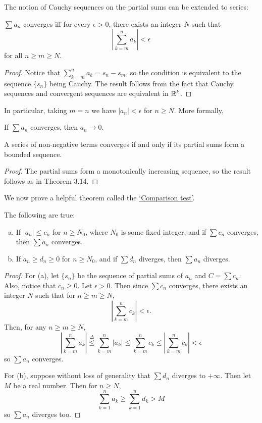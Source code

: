 The notion of Cauchy sequences on the partial sums can be extended to series:
\begin{theorem} %
$\sum a_n$ converges iff for every $\epsilon > 0$, there exists an integer $N$ such that
\[
	\left| \sum_{k=m}^{n} a_k \right| < \epsilon
\]
for all $n \ge m \ge N$. 

\begin{proof}
Notice that $\sum_{k=m}^{n} a_k = s_n - s_m$, so the condition is equivalent to the sequence $\{s_n\}$ being Cauchy. The result follows from the fact that Cauchy sequences and convergent sequences are equivalent in $\mathbb{R}^k$.
\end{proof}
\end{theorem}

In particular, taking $m = n$ we have $|a_n| < \epsilon$ for $n \ge N$. More formally,

\begin{theorem} %
If $\sum a_n$ converges, then $a_n \to 0$.
\end{theorem}

\begin{theorem} %
A series of non-negative terms converges if and only if its partial sums form a bounded sequence.

\begin{proof}
The partial sums form a monotonically increasing sequence, so the result follows as in Theorem 3.14.
\end{proof}
\end{theorem}

We now prove a helpful theorem called the \underline{`Comparison test'}. 

\begin{theorem} %
The following are true:
\begin{enumerate}[(a)]
\item If $|a_n| \le c_n$ for $n \ge N_0$, where $N_0$ is some fixed integer, and if $\sum c_n$ converges, then $\sum a_n$ converges.

\item If $a_n \ge d_n \ge 0$ for $n \ge N_0$, and if $\sum d_n$ diverges, then $\sum a_n$ diverges.
\end{enumerate}

\begin{proof}
For (a), let $\{s_n\}$ be the sequence of partial sums of $a_n$ and $C = \sum c_n$. Also, notice that $c_n \ge 0$. Let $\epsilon > 0$. Then since $\sum c_n$ converges, there exists an integer $N$ such that for $n \ge m \ge N$,
\[
	\left|\sum_{k=m}^{n} c_k\right| < \epsilon.
\]
Then, for any $n \ge m \ge N$,
\[
	\left| \sum_{k=m}^{n} a_k \right| \overset{\Delta}{\le} \sum_{k=m}^{n} |a_k| \le \sum_{k=m}^{n} c_k \le \left|\sum_{k=m}^{n} c_k\right| < \epsilon
\]
so $\sum a_n$ converges.

For (b), suppose without loss of generality that $\sum d_n$ diverges to $+\infty$. Then let $M$ be a real number. Then for $n \ge N$, 
\[
	\sum_{k=1}^{n} a_k \ge \sum_{k=1}^{n} d_k > M
\]
so $\sum a_n$ diverges too.
\end{proof}
\end{theorem}

